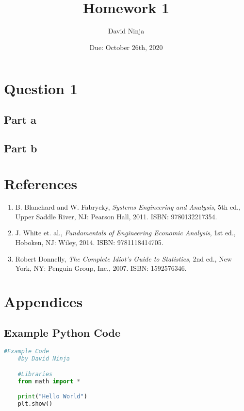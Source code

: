 
\title{Homework 1}
\author{David Ninja}
\date{Due: October 26th, 2020}


\maketitle

\section*{Question 1}
	\subsection*{Part a}
	\subsection*{Part b}

\section*{References}
	\begin{enumerate}
		\item \label{Blanchard} B. Blanchard and W. Fabrycky, \textit{Systems Engineering and Analysis}, 5th ed., Upper Saddle River, NJ: Pearson Hall, 2011. ISBN: 9780132217354.
		\item \label{White} J. White et. al., \textit{Fundamentals of Engineering Economic Analysis}, 1st ed.,  Hoboken, NJ: Wiley, 2014. ISBN: 9781118414705.
		\item \label{Donnelly} Robert Donnelly, \textit{The Complete Idiot's Guide to Statistics}, 2nd ed., New York, NY: Penguin Group, Inc., 2007. ISBN: 1592576346.
	\end{enumerate}

\section*{Appendices}
	\subsection*{Example Python Code}
	\begin{lstlisting}[language=Python,caption=Example Code]
	#Example Code
	#by David Ninja

	#Libraries
	from math import *

	print("Hello World")
	plt.show()\end{lstlisting}
